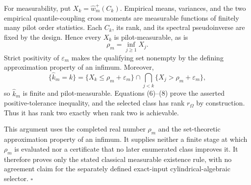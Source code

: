 For measurability, put \(X_k=\widehat w_m^+(C_k)\).  Empirical means, variances, and the two empirical quantile-coupling cross moments are measurable functions of finitely many pilot order statistics.  Each \(C_k\), its rank, and its spectral pseudoinverse are fixed by the design.  Hence every \(X_k\) is pilot-measurable, as is
\[
\rho_m=\inf_{j\ge1}X_j.
\tag{7}
\]
Strict positivity of \(\varepsilon_m\) makes the qualifying set nonempty by the defining approximation property of an infimum.  Moreover,
\[
\{\widehat k_m=k\}
=\{X_k\le\rho_m+\varepsilon_m\}
\cap\bigcap_{j<k}\{X_j>\rho_m+\varepsilon_m\},
\tag{8}
\]
so \(\widehat k_m\) is finite and pilot-measurable.  Equations (6)--(8) prove the asserted positive-tolerance inequality, and the selected class has rank \(r_\Omega\) by construction.  Thus it has rank two exactly when rank two is achievable.

This argument uses the completed real number \(\rho_m\) and the set-theoretic approximation property of an infimum.  It supplies neither a finite stage at which \(\rho_m\) is evaluated nor a certificate that no later enumerated class improves it.  It therefore proves only the stated classical measurable existence rule, with no agreement claim for the separately defined exact-input cylindrical-algebraic selector. \(\square\)